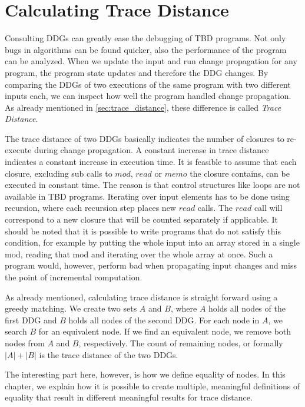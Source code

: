 \chapter{Calculating Trace Distance}
\label{ch:calc_trace_distance}

Consulting DDGs can greatly ease the debugging of TBD programs. Not only bugs in algorithms can be found quicker, also the performance of the program can be analyzed. When we update the input and run change propagation for any program, the program state updates and therefore the DDG changes. By comparing the DDGs of two executions of the same program with two different inputs each, we can inspect how well the program handled change propagation. As already mentioned in \ref{sec:trace_distance}, these difference is called \textit{Trace Distance}. 

The trace distance of two DDGs basically indicates the number of closures to re-execute during change propagation. A constant increase in trace distance indicates a constant increase in execution time. It is feasible to assume that each closure, excluding sub calls to $mod$, $read$ or $memo$ the closure contains, can be executed in constant time. The reason is that control structures like loops are not available in TBD programs. Iterating over input elements has to be done using recursion, where each recursion step places new $read$ calls. The $read$ call will correspond to a new closure that will be counted separately if applicable. It should be noted that it is possible to write programs that do not satisfy this condition, for example by putting the whole input into an array stored in a single mod, reading that mod and iterating over the whole array at once. Such a program would, however, perform bad when propagating input changes and miss the point of incremental computation.

As already mentioned, calculating trace distance is straight forward using a greedy matching. We create two sets $A$ and $B$, where $A$ holds all nodes of the first DDG and $B$ holds all nodes of the second DDG. For each node in $A$, we search $B$ for an equivalent node. If we find an equivalent node, we remove both nodes from $A$ and $B$, respectively. The count of remaining nodes, or formally $|A| + |B|$ is the trace distance of the two DDGs. 

The interesting part here, however, is how we define equality of nodes. In this chapter, we explain how it is possible to create multiple, meaningful definitions of equality that result in different meaningful results for trace distance. 

